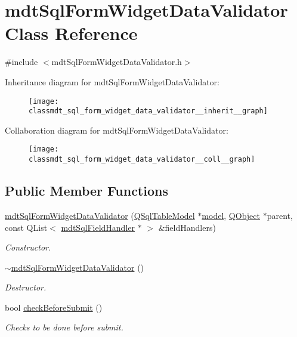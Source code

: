 \hypertarget{classmdt_sql_form_widget_data_validator}{\section{mdt\-Sql\-Form\-Widget\-Data\-Validator Class Reference}
\label{classmdt_sql_form_widget_data_validator}
}


{\ttfamily \#include $<$mdt\-Sql\-Form\-Widget\-Data\-Validator.\-h$>$}



Inheritance diagram for mdt\-Sql\-Form\-Widget\-Data\-Validator\-:\nopagebreak
\begin{figure}[H]
\begin{center}
\leavevmode
\texttt{[image: classmdt\_sql\_form\_widget\_data\_validator\_\_inherit\_\_graph]}
\end{center}
\end{figure}


Collaboration diagram for mdt\-Sql\-Form\-Widget\-Data\-Validator\-:\nopagebreak
\begin{figure}[H]
\begin{center}
\leavevmode
\texttt{[image: classmdt\_sql\_form\_widget\_data\_validator\_\_coll\_\_graph]}
\end{center}
\end{figure}
\subsection*{Public Member Functions}
\begin{DoxyCompactItemize}
\item 
\hyperlink{classmdt_sql_form_widget_data_validator_a3477841cdb2ab659c96ce3363efbadbc}{mdt\-Sql\-Form\-Widget\-Data\-Validator} (\hyperlink{class_q_sql_table_model}{Q\-Sql\-Table\-Model} $\ast$\hyperlink{classmdt_sql_data_validator_a4970687a15ac3c8099c13164fba58291}{model}, \hyperlink{class_q_object}{Q\-Object} $\ast$parent, const Q\-List$<$ \hyperlink{classmdt_sql_field_handler}{mdt\-Sql\-Field\-Handler} $\ast$ $>$ \&field\-Handlers)
\begin{DoxyCompactList}\small\item\em Constructor. \end{DoxyCompactList}\item 
\hyperlink{classmdt_sql_form_widget_data_validator_aec2505ec4b25b1fae3e37cd13f4afe07}{$\sim$mdt\-Sql\-Form\-Widget\-Data\-Validator} ()
\begin{DoxyCompactList}\small\item\em Destructor. \end{DoxyCompactList}\item 
bool \hyperlink{classmdt_sql_form_widget_data_validator_aa577e4acf4d0f371c45a67c18c59a924}{check\-Before\-Submit} ()
\begin{DoxyCompactList}\small\item\em Checks to be done before submit. \end{DoxyCompactList}\end{DoxyCompactItemize}



